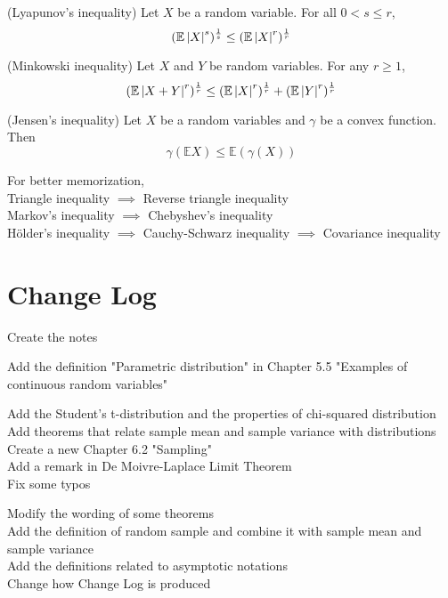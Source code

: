 \documentclass{huhtakm-template-book}
\newcommand{\expect}{\mathbb{E}}
\begin{document}
\begin{thm}(Lyapunov's inequality)
	Let $X$ be a random variable. For all $0<s\leq r$,
	\begin{equation*}
		(\expect\abs{X}^{s})^{\frac{1}{s}}\leq(\expect\abs{X}^{r})^{\frac{1}{r}}
	\end{equation*}
\end{thm}
\begin{thm}(Minkowski inequality)
	Let $X$ and $Y$ be random variables. For any $r\geq 1$,
	\begin{equation*}
		(\expect\abs{X+Y}^{r})^{\frac{1}{r}}\leq(\expect\abs{X}^{r})^{\frac{1}{r}}+(\expect\abs{Y}^{r})^{\frac{1}{r}}
	\end{equation*}
\end{thm}
\begin{thm}(Jensen's inequality)
	Let $X$ be a random variables and $\gamma$ be a convex function. Then
	\begin{equation*}
		\gamma(\expect X)\leq\expect(\gamma(X))
	\end{equation*}
\end{thm}
For better memorization,\\
Triangle inequality $\implies$ Reverse triangle inequality\\
Markov's inequality $\implies$ Chebyshev's inequality\\
H\"older's inequality $\implies$ Cauchy-Schwarz inequality $\implies$ Covariance inequality

\chapter*{Change Log}
\begin{description}[style=nextline]
	\item[1.0]
	Create the notes\\
	\item[1.1]
	Add the definition "Parametric distribution" in Chapter 5.5 "Examples of continuous random variables"\\
	\item[1.2]
	 Add the Student's t-distribution and the properties of chi-squared distribution\\
	Add theorems that relate sample mean and sample variance with distributions\\
	Create a new Chapter 6.2 "Sampling"\\
	Add a remark in De Moivre-Laplace Limit Theorem\\
	Fix some typos\\
	\item[1.3]
	Modify the wording of some theorems\\
	Add the definition of random sample and combine it with sample mean and sample variance\\
	Add the definitions related to asymptotic notations\\
	Change how Change Log is produced
\end{description}
\end{document}
